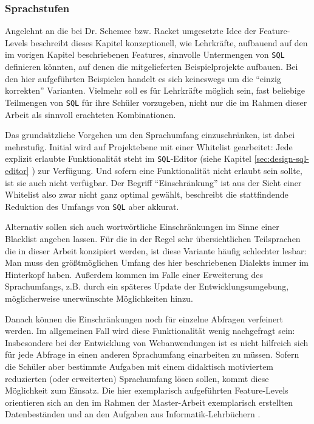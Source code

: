 \subsubsection{Sprachstufen}
\label{sec:sql-subset-ranks}

Angelehnt an die bei Dr. Schemee bzw. Racket umgesetzte Idee der Feature-Levels \cite{macht-der-abstraktion} beschreibt dieses Kapitel konzeptionell, wie Lehrkräfte, aufbauend auf den im vorigen Kapitel beschriebenen Features, sinnvolle Untermengen von \texttt{SQL} definieren könnten, auf denen die mitgelieferten Beispielprojekte aufbauen. Bei den hier aufgeführten Beispielen handelt es sich keineswegs um die "`einzig korrekten"' Varianten. Vielmehr soll es für Lehrkräfte möglich sein, fast beliebige Teilmengen von \texttt{SQL} für ihre Schüler vorzugeben, nicht nur die im Rahmen dieser Arbeit als sinnvoll erachteten Kombinationen.

Das grundsätzliche Vorgehen um den Sprachumfang einzuschränken, ist dabei mehrstufig. Initial wird auf Projektebene mit einer Whitelist gearbeitet: Jede explizit erlaubte Funktionalität steht im \texttt{SQL}-Editor (siehe Kapitel \ref{sec:design-sql-editor} ) zur Verfügung. Und sofern eine Funktionalität nicht erlaubt sein sollte, ist sie auch nicht verfügbar. Der Begriff ``Einschränkung'' ist aus der Sicht einer Whitelist also zwar nicht ganz optimal gewählt, beschreibt die stattfindende Reduktion des Umfangs von \texttt{SQL} aber akkurat.

Alternativ sollen sich auch wortwörtliche Einschränkungen im Sinne einer Blacklist angeben lassen. Für die in der Regel sehr übersichtlichen Teilsprachen die in dieser Arbeit konzipiert werden, ist diese Variante häufig schlechter lesbar: Man muss den größtmöglichen Umfang des hier beschriebenen Dialekts immer im Hinterkopf haben. Außerdem kommen im Falle einer Erweiterung des Sprachumfangs, z.B. durch ein späteres Update der Entwicklungsumgebung, möglicherweise unerwünschte Möglichkeiten hinzu.

Danach können die Einschränkungen noch für einzelne Abfragen verfeinert werden. Im allgemeinen Fall wird diese Funktionalität wenig nachgefragt sein: Insbesondere bei der Entwicklung von Webanwendungen ist es nicht hilfreich sich für jede Abfrage in einen anderen Sprachumfang einarbeiten zu müssen. Sofern die Schüler aber bestimmte Aufgaben mit einem didaktisch motiviertem reduzierten (oder erweiterten) Sprachumfang lösen sollen, kommt diese Möglichkeit zum Einsatz. Die hier exemplarisch aufgeführten Feature-Levels orientieren sich an den im Rahmen der Master-Arbeit exemplarisch erstellten Datenbeständen und an den Aufgaben aus Informatik-Lehrbüchern \cite{hubwieser_inf_2, grimm_informatik_2015}.


